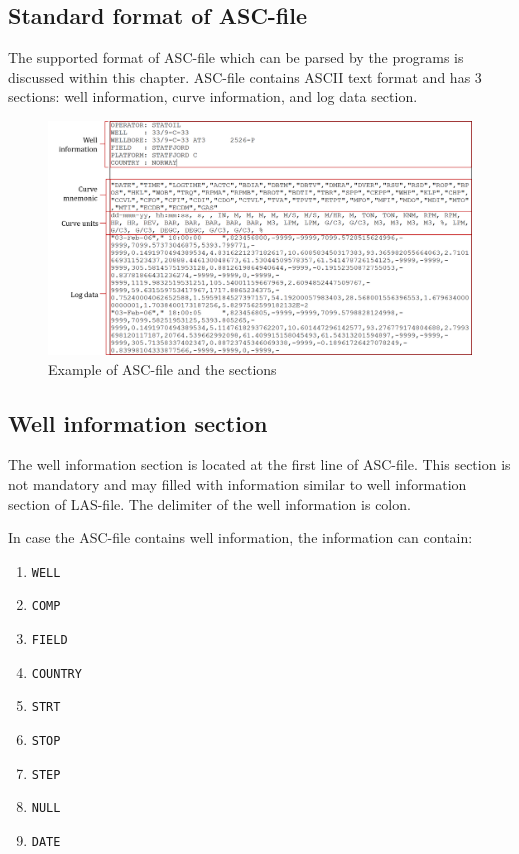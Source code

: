 \documentclass[12pt,a4paper,oneside]{report}
\begin{document}
\begin{appendices}
\chapter{Standard format of ASC-file}
\label{ch:asc_std}
The supported format of ASC-file which can be parsed by the programs is discussed within this chapter. ASC-file contains ASCII text format and has 3 sections: well information, curve information, and log data section.

\begin{figure}[ht]
\centering
\includegraphics[width=\textwidth]{asc_example.png}
\caption{Example of ASC-file and the sections}
\end{figure}

\section{Well information section}
The well information section is located at the first line of ASC-file. This section is not mandatory and may filled with information similar to well information section of LAS-file. The delimiter of the well information is colon.

In case the ASC-file contains well information, the information can contain:
\begin{enumerate}
\TabPositions{2cm}
\setlength\itemsep{0.1em}
\item \texttt{WELL} 
\item \texttt{COMP} 
\item \texttt{FIELD} 
\item \texttt{COUNTRY} 
\item \texttt{STRT} 
\item \texttt{STOP} 
\item \texttt{STEP} 
\item \texttt{NULL} 
\item \texttt{DATE} 
\end{enumerate}


\end{appendices}
\end{document}
